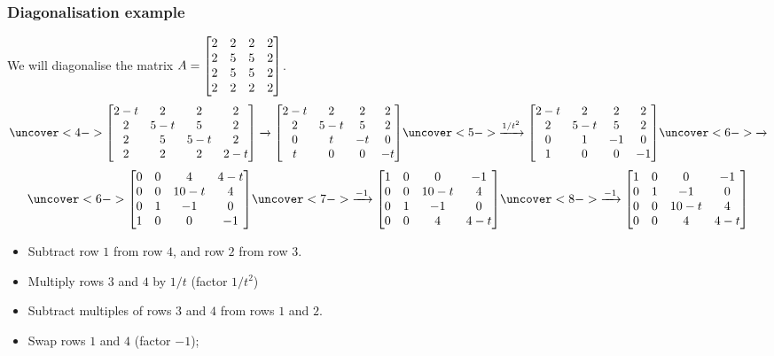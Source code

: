 \documentclass[9pt]{beamer}
\begin{document}
\begin{frame}[t]
 \frametitle{Diagonalisation example}
 
 We will diagonalise the matrix
 $A = \left[\begin{matrix} 2&2&2&2 \\ 2&5&5&2 \\ 2&5&5&2 \\ 2&2&2&2 \end{matrix}\right]$. 
 {\tiny \[
    \uc<4->{\bbm 2-t & 2   & 2   & 2 \\
         2   & 5-t & 5   & 2 \\
         2   & 5   & 5-t & 2 \\
         2   & 2   & 2   & 2-t \ebm
    \xra{}
    \bbm 2-t & 2   & 2   & 2 \\
         2   & 5-t & 5   & 2 \\
         0   & t   & -t  & 0 \\
         t   & 0   & 0   & -t \ebm}
    \uc<5->{\xra{1/t^2}
    \bbm 2-t & 2   & 2   & 2 \\
         2   & 5-t & 5   & 2 \\
         0   & 1   & -1  & 0 \\
         1   & 0   & 0   & -1 \ebm}
    \uc<6->{\xra{}}
 \] \[
    \uc<6->{\bbm 0   & 0   & 4    & 4-t \\
         0   & 0   & 10-t & 4 \\
         0   & 1   & -1   & 0 \\
         1   & 0   & 0    & -1 \ebm}
    \uc<7->{\xra{-1}
    \bbm 1   & 0   & 0    & -1 \\
         0   & 0   & 10-t & 4 \\
         0   & 1   & -1   & 0 \\
         0   & 0   & 4    & 4-t \ebm}
    \uc<8->{\xra{-1}
    \bbm 1   & 0   & 0    & -1 \\
         0   & 1   & -1   & 0 \\
         0   & 0   & 10-t & 4 \\
         0   & 0   & 4    & 4-t \ebm}
 \]}
 \begin{itemize}
  \item<4-> Subtract row $1$ from row $4$, and row $2$ from row $3$.
  \item<5-> Multiply rows $3$ and $4$ by $1/t$ (factor $1/t^2$)
  \item<6-> Subtract multiples of rows $3$ and $4$ from rows $1$ and $2$.
  \item<7-> Swap rows $1$ and $4$ (factor $-1$);
 \end{itemize} 
\end{frame}
 
\end{document}
